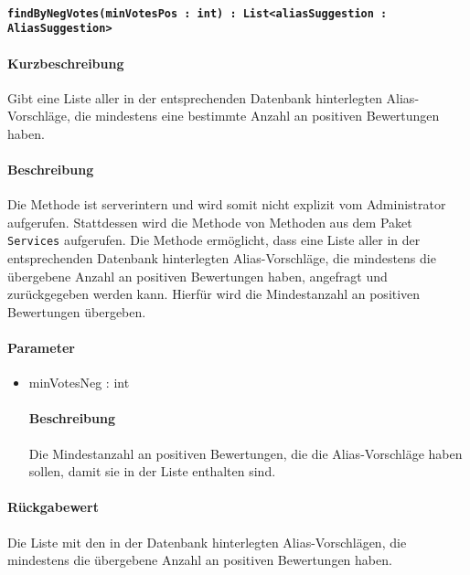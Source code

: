 \paragraph{\texttt{findByNegVotes(minVotesPos : int) : List<aliasSuggestion : AliasSuggestion>}}%
\paragraph*{Kurzbeschreibung}
Gibt eine Liste aller in der entsprechenden Datenbank hinterlegten Alias-Vorschläge, die mindestens eine bestimmte Anzahl an positiven Bewertungen haben.
\paragraph*{Beschreibung}
Die Methode ist serverintern und wird somit nicht explizit vom Administrator aufgerufen.
Stattdessen wird die Methode von Methoden aus dem Paket \texttt{Services} aufgerufen.
Die Methode ermöglicht, dass eine Liste aller in der entsprechenden Datenbank hinterlegten Alias-Vorschläge, die mindestens die übergebene Anzahl an positiven Bewertungen haben, angefragt und zurückgegeben werden kann.
Hierfür wird die Mindestanzahl an positiven Bewertungen übergeben.
\paragraph*{Parameter}
\begin{itemize}
    \item minVotesNeg : int
    		\paragraph*{Beschreibung}
    		Die Mindestanzahl an positiven Bewertungen, die die Alias-Vorschläge haben sollen, damit sie in der Liste enthalten sind.
\end{itemize}
\paragraph*{Rückgabewert}
Die Liste mit den in der Datenbank hinterlegten Alias-Vorschlägen, die mindestens die übergebene Anzahl an positiven Bewertungen haben.
